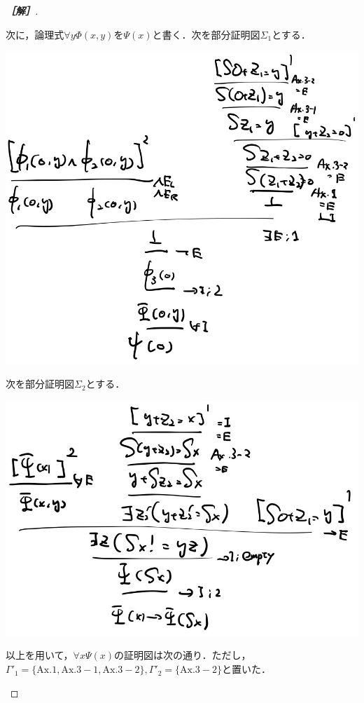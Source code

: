 \documentclass[uplatex,dvipdfmx]{jsarticle}
\begin{document}
\begin{proof}[\bf{［解］}]
\begin{center}
    \end{center}
    次に，論理式$\forall y\Phi(x,y)$を$\Psi(x)$と書く．次を部分証明図$\Sigma_1$とする．
    \begin{center}
        \includegraphics[width=15cm]{figure3-7.jpg}
    \end{center}
    次を部分証明図$\Sigma_2$とする．
    \begin{center}
        \includegraphics[width=15cm]{figure3-8.jpg}
    \end{center}
    以上を用いて，$\forall x\Psi(x)$の証明図は次の通り．ただし，$\Gamma'_1=\{\mathrm{Ax.1,Ax.3-1,Ax.3-2 }\},\Gamma'_2=\{\mathrm{Ax.3-2}\}$と置いた．
    \begin{center}

\end{center}
\end{proof}
\end{document}
